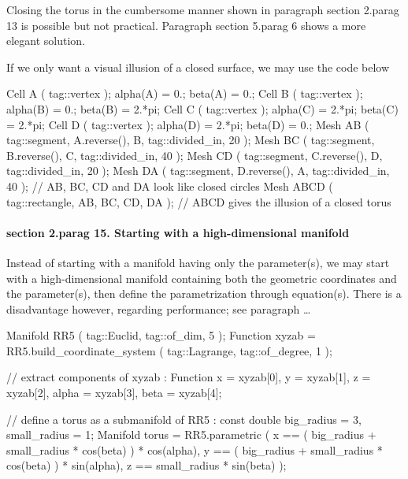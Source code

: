 Closing the torus in the cumbersome manner shown in paragraph \numb section 2.\numb parag 13
is possible but not practical.
Paragraph \numb section 5.\numb parag 6 shows a more elegant solution.

If we only want a visual illusion of a closed surface, we may use the code below

\verbatim
   Cell A ( tag::vertex );  alpha(A) = 0.;     beta(A) = 0.;
   Cell B ( tag::vertex );  alpha(B) = 0.;     beta(B) = 2.*pi;
   Cell C ( tag::vertex );  alpha(C) = 2.*pi;  beta(C) = 2.*pi;
   Cell D ( tag::vertex );  alpha(D) = 2.*pi;  beta(D) = 0.;
   Mesh AB ( tag::segment, A.reverse(), B, tag::divided_in, 20 );
   Mesh BC ( tag::segment, B.reverse(), C, tag::divided_in, 40 );
   Mesh CD ( tag::segment, C.reverse(), D, tag::divided_in, 20 );
   Mesh DA ( tag::segment, D.reverse(), A, tag::divided_in, 40 );
   // AB, BC, CD and DA look like closed circles
   Mesh ABCD ( tag::rectangle, AB, BC, CD, DA );
   // ABCD gives the illusion of a closed torus
\endverbatim


\paragraph{\numb section 2.\numb parag 15. Starting with a high-dimensional manifold}

Instead of starting with a manifold having only the parameter(s), we may start with a
high-dimensional manifold containing both the geometric coordinates and the parameter(s),
then define the parametrization through equation(s).
There is a disadvantage however, regarding performance; see paragraph \dots

\verbatim
   Manifold RR5 ( tag::Euclid, tag::of_dim, 5 );
   Function xyzab = RR5.build_coordinate_system ( tag::Lagrange, tag::of_degree, 1 );

   // extract components of xyzab :
   Function x = xyzab[0], y = xyzab[1], z = xyzab[2], alpha = xyzab[3], beta = xyzab[4];

   // define a torus as a submanifold of RR5 :
   const double big_radius = 3, small_radius = 1;
   Manifold torus = RR5.parametric
      ( x == ( big_radius + small_radius * cos(beta) ) * cos(alpha),
        y == ( big_radius + small_radius * cos(beta) ) * sin(alpha),
        z == small_radius * sin(beta)                                );

